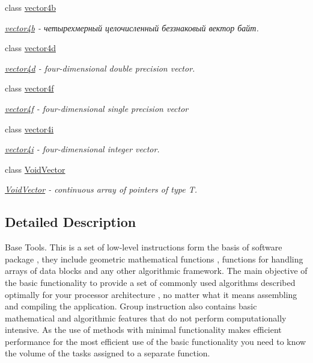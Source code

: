 \begin{DoxyCompactItemize}
class \hyperlink{classbt_1_1vector4b}{vector4b}
\begin{DoxyCompactList}\small\item\em \hyperlink{classbt_1_1vector4b}{vector4b} -\/ четырехмерный целочисленный беззнаковый вектор байт. \end{DoxyCompactList}\item 
class \hyperlink{classbt_1_1vector4d}{vector4d}
\begin{DoxyCompactList}\small\item\em \hyperlink{classbt_1_1vector4d}{vector4d} -\/ four-\/dimensional double precision vector. \end{DoxyCompactList}\item 
class \hyperlink{classbt_1_1vector4f}{vector4f}
\begin{DoxyCompactList}\small\item\em \hyperlink{classbt_1_1vector4f}{vector4f} -\/ four-\/dimensional single precision vector \end{DoxyCompactList}\item 
class \hyperlink{classbt_1_1vector4i}{vector4i}
\begin{DoxyCompactList}\small\item\em \hyperlink{classbt_1_1vector4i}{vector4i} -\/ four-\/dimensional integer vector. \end{DoxyCompactList}\item 
class \hyperlink{classbt_1_1_void_vector}{Void\-Vector}
\begin{DoxyCompactList}\small\item\em \hyperlink{classbt_1_1_void_vector}{Void\-Vector} -\/ continuous array of pointers of type T. \end{DoxyCompactList}\end{DoxyCompactItemize}


\subsection{Detailed Description}
Base Tools. This is a set of low-\/level instructions form the basis of software package , they include geometric mathematical functions , functions for handling arrays of data blocks and any other algorithmic framework. The main objective of the basic functionality to provide a set of commonly used algorithms described optimally for your processor architecture , no matter what it means assembling and compiling the application. Group instruction also contains basic mathematical and algorithmic features that do not perform computationally intensive. As the use of methods with minimal functionality makes efficient performance for the most efficient use of the basic functionality you need to know the volume of the tasks assigned to a separate function.

